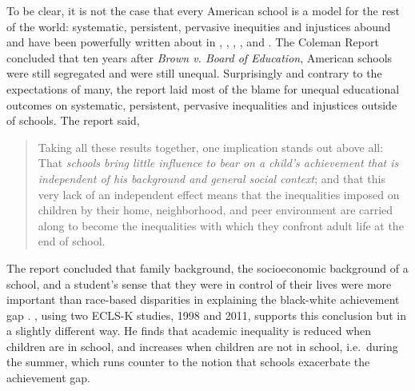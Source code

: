 To be clear, it is not the case that every American school is a model for the
rest of the world: systematic, persistent, pervasive inequities and injustices
abound and have been powerfully written about in \textcite{Kozol1992}, \textcite{Valenzuela1999}, \textcite{Kozol2005}, \textcite{Heitzeg2009}, and \textcite{Roithmayr2021}. The Coleman Report \parencite{Coleman1966} concluded that ten years after \textit{Brown v. Board of Education}, American schools were still segregated and were still unequal. Surprisingly and contrary to the expectations of many, the report laid most of the blame for unequal educational outcomes on systematic, persistent, pervasive inequalities and injustices outside of schools. The report said,
\blockquote[{\parencite[325]{Coleman1966}}][]{\SingleSpacing\vspace{-0.5\baselineskip}%
  Taking all these results together, one implication stands out above all: That \textit{schools bring little influence to bear on a child's achievement that is independent of his background and general social context}; and that this very lack of an independent effect means that the inequalities imposed on children by their home, neighborhood, and peer environment are carried along to become the inequalities with which they confront adult life at the end of school.}
The report concluded that family background, the socioeconomic background of a school, and a student's sense that they were in control of their lives were more important than race-based disparities in explaining the black-white achievement gap \parencite{Pearce2016}. \textcite{Downey2020}, using two ECLS-K studies, 1998 and 2011, supports this conclusion but in a slightly different way. He finds that academic inequality is reduced when children are in school, and increases when children are not in school, i.e.~during the summer, which runs counter to the notion that schools exacerbate the achievement gap.

